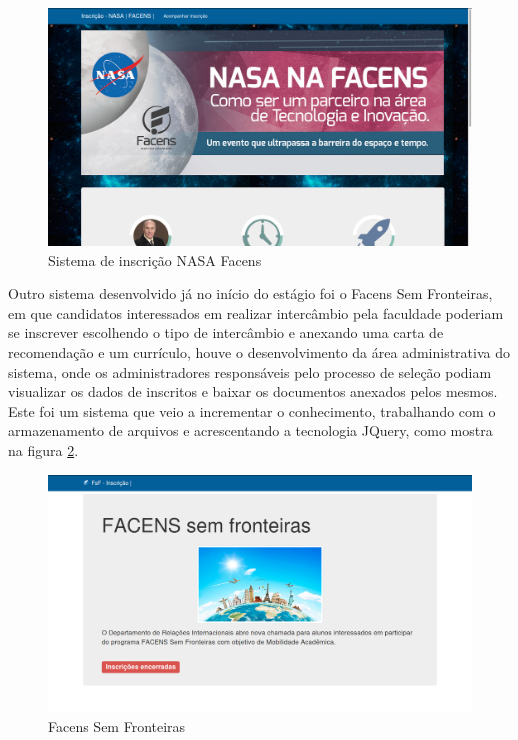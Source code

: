 \documentclass[
	12pt,				%
	oneside,			%
	a4paper,			%
	chapter=TITLE,		%
	section=TITLE,		%
	sumario=tradicional %
	english,			%
	french,				%
	spanish,			%
	brazil				%
	]{abntex2}
\begin{document}
\begin{figure}[htb]
	\caption{\label{fig:nasa} Sistema de inscrição NASA Facens}
	\begin{center}
		\includegraphics[scale=0.3]{nasa}
	\end{center}
\end{figure}

Outro sistema desenvolvido já no início do estágio foi o Facens Sem Fronteiras, em que candidatos interessados em realizar intercâmbio pela faculdade poderiam se inscrever escolhendo o tipo de intercâmbio e anexando uma carta de recomendação e um currículo, houve o desenvolvimento da área administrativa do sistema, onde os administradores responsáveis pelo processo de seleção podiam visualizar os dados de inscritos e baixar os documentos anexados pelos mesmos. Este foi um sistema que veio a incrementar o conhecimento, trabalhando com o armazenamento de arquivos e acrescentando a tecnologia JQuery, como mostra na figura \ref{fig:fsf}.

\begin{figure}[htb]
	\caption{\label{fig:fsf} Facens Sem Fronteiras}
	\begin{center}
		\includegraphics[scale=0.3]{fsf}
	\end{center}
\end{figure}
\end{document}

